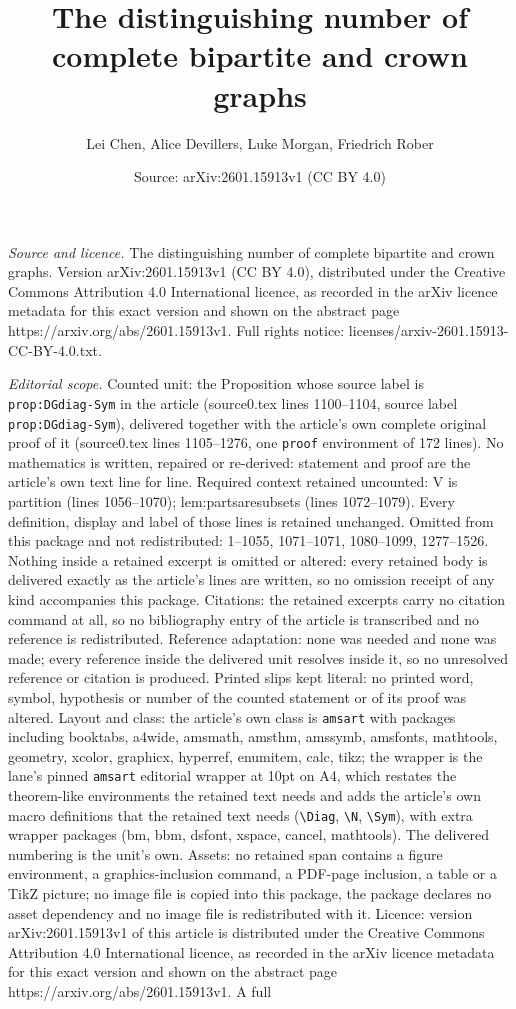 \documentclass[10pt,a4paper]{amsart}
\title[The distinguishing number of complete bipartite and crown gr]{The distinguishing number of complete bipartite and crown graphs}
\author{Lei Chen, Alice Devillers, Luke Morgan, Friedrich Rober}
\date{Source: arXiv:2601.15913v1 (CC BY 4.0)}
\begin{document}
\maketitle

\noindent\emph{Source and licence.} The distinguishing number of complete bipartite and crown graphs. Version arXiv:2601.15913v1 (CC BY 4.0), distributed under the Creative Commons Attribution 4.0 International licence, as recorded in the arXiv licence metadata for this exact version and shown on the abstract page https://arxiv.org/abs/2601.15913v1. Full rights notice: licenses/arxiv-2601.15913-CC-BY-4.0.txt.\par\smallskip

\noindent\textit{Editorial scope.} Counted unit: the Proposition whose source label is \texttt{prop:DGdiag-Sym} in the article (source0.tex lines 1100--1104, source label \texttt{prop:DGdiag-Sym}), delivered together with the article's own complete original proof of it (source0.tex lines 1105--1276, one \texttt{proof} environment of 172 lines). No mathematics is written, repaired or re-derived: statement and proof are the article's own text line for line. Required context retained uncounted: V is partition (lines 1056--1070); lem:partsaresubsets (lines 1072--1079). Every definition, display and label of those lines is retained unchanged. Omitted from this package and not redistributed: 1--1055, 1071--1071, 1080--1099, 1277--1526. Nothing inside a retained excerpt is omitted or altered: every retained body is delivered exactly as the article's lines are written, so no omission receipt of any kind accompanies this package. Citations: the retained excerpts carry no citation command at all, so no bibliography entry of the article is transcribed and no reference is redistributed. Reference adaptation: none was needed and none was made; every reference inside the delivered unit resolves inside it, so no unresolved reference or citation is produced. Printed slips kept literal: no printed word, symbol, hypothesis or number of the counted statement or of its proof was altered. Layout and class: the article's own class is \texttt{amsart} with packages including booktabs, a4wide, amsmath, amsthm, amssymb, amsfonts, mathtools, geometry, xcolor, graphicx, hyperref, enumitem, calc, tikz; the wrapper is the lane's pinned \texttt{amsart} editorial wrapper at 10pt on A4, which restates the theorem-like environments the retained text needs and adds the article's own macro definitions that the retained text needs (\texttt{\textbackslash Diag}, \texttt{\textbackslash N}, \texttt{\textbackslash Sym}), with extra wrapper packages (bm, bbm, dsfont, xspace, cancel, mathtools). The delivered numbering is the unit's own. Assets: no retained span contains a figure environment, a graphics-inclusion command, a PDF-page inclusion, a table or a TikZ picture; no image file is copied into this package, the package declares no asset dependency and no image file is redistributed with it. Licence: version arXiv:2601.15913v1 of this article is distributed under the Creative Commons Attribution 4.0 International licence, as recorded in the arXiv licence metadata for this exact version and shown on the abstract page https://arxiv.org/abs/2601.15913v1. A full 
\end{document}
